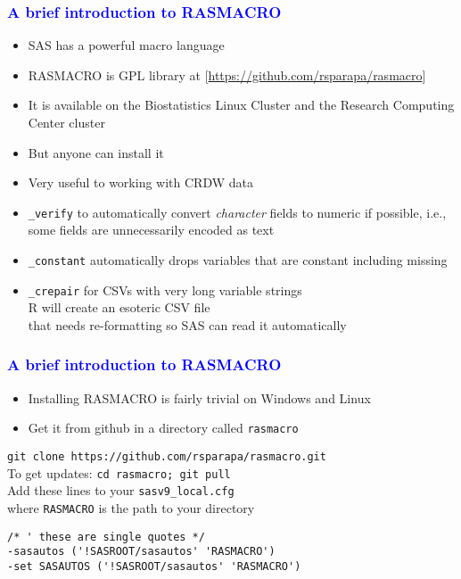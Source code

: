 \documentclass[11pt,pdftex,dvipsnames,usenames]{beamer}
\begin{document}
\begin{frame}[fragile]\frametitle{\bf\textcolor{blue}{A brief
introduction to RASMACRO}}
\begin{itemize}
\item SAS has a powerful macro language
\item RASMACRO is GPL library at 
\textcolor{PineGreen}{[\href{https://github.com/rsparapa/rasmacro}{https://github.com/rsparapa/rasmacro}]}
\item It is available on the Biostatistics Linux Cluster
and the Research Computing Center cluster
\item But anyone can install it
\item Very useful to working with CRDW data 
\item \texttt{\_verify} to automatically convert {\it character} fields to numeric if possible,
i.e., some fields are unnecessarily encoded as text
\item \texttt{\_constant} automatically drops variables that are constant including missing
\item \texttt{\_crepair} for CSVs with very long variable strings\\
R will create an esoteric CSV file\\
that needs re-formatting so SAS can read it automatically
\end{itemize}
\end{frame}


\begin{frame}[fragile]\frametitle{\bf\textcolor{blue}{A brief
introduction to RASMACRO}}
\begin{itemize}
\item Installing RASMACRO is fairly trivial on Windows and Linux
\item Get it from github in a directory called \texttt{rasmacro}
\end{itemize}
\texttt{git clone https://github.com/rsparapa/rasmacro.git} \\
To get updates: \texttt{cd rasmacro; git pull} \\
Add these lines to your \texttt{sasv9\_local.cfg} \\
where \texttt{RASMACRO} is the path to your directory 
\begin{verbatim}
/* ' these are single quotes */
-sasautos ('!SASROOT/sasautos' 'RASMACRO') 
-set SASAUTOS ('!SASROOT/sasautos' 'RASMACRO')
\end{verbatim}
\end{frame}
\end{document}
